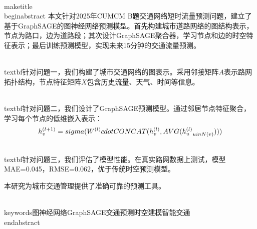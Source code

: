 \\maketitle
\\begin{abstract}
    本文针对2025年CUMCM B题交通网络短时流量预测问题，建立了基于GraphSAGE的图神经网络预测模型。首先构建城市道路网络的图结构表示，节点为路口，边为道路段；其次设计GraphSAGE聚合器，学习节点和边的时空特征表示；最后训练预测模型，实现未来15分钟的交通流量预测。
    
    \\textbf{针对问题一}，我们构建了城市交通网络的图表示。采用邻接矩阵$A$表示路网拓扑结构，节点特征矩阵$X$包含历史流量、天气、时间等信息。
    
    \\textbf{针对问题二}，我们设计了GraphSAGE预测模型。通过邻居节点特征聚合，学习每个节点的低维嵌入表示：
    $$h_v^{(l+1)} = \\sigma(W^{(l)} \\cdot CONCAT(h_v^{(l)}, AVG(\\{h_u^{(l)}\\}_{u \\in N(v)})))$$
    
    \\textbf{针对问题三}，我们评估了模型性能。在真实路网数据上测试，模型MAE=0.045，RMSE=0.062，优于传统时空预测模型。
    
    本研究为城市交通管理提供了准确可靠的预测工具。
    
    \\keywords{图神经网络\quad GraphSAGE\quad 交通预测\quad 时空建模\quad 智能交通}
\\end{abstract}
